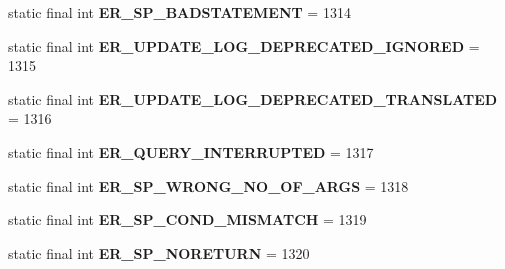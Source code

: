 \begin{DoxyCompactItemize}
static final int {\bfseries E\+R\+\_\+\+S\+P\+\_\+\+B\+A\+D\+S\+T\+A\+T\+E\+M\+E\+NT} = 1314
\item 
\mbox{\label{classcom_1_1mysql_1_1cj_1_1exceptions_1_1_mysql_error_numbers_ad3e4b41542fa2dc494d76996df92c1fd}} 
static final int {\bfseries E\+R\+\_\+\+U\+P\+D\+A\+T\+E\+\_\+\+L\+O\+G\+\_\+\+D\+E\+P\+R\+E\+C\+A\+T\+E\+D\+\_\+\+I\+G\+N\+O\+R\+ED} = 1315
\item 
\mbox{\label{classcom_1_1mysql_1_1cj_1_1exceptions_1_1_mysql_error_numbers_aa0b9f0221734bbec1a88cfa9b05177ef}} 
static final int {\bfseries E\+R\+\_\+\+U\+P\+D\+A\+T\+E\+\_\+\+L\+O\+G\+\_\+\+D\+E\+P\+R\+E\+C\+A\+T\+E\+D\+\_\+\+T\+R\+A\+N\+S\+L\+A\+T\+ED} = 1316
\item 
\mbox{\label{classcom_1_1mysql_1_1cj_1_1exceptions_1_1_mysql_error_numbers_ac9299f87c39b3b537c7926d5385e57de}} 
static final int {\bfseries E\+R\+\_\+\+Q\+U\+E\+R\+Y\+\_\+\+I\+N\+T\+E\+R\+R\+U\+P\+T\+ED} = 1317
\item 
\mbox{\label{classcom_1_1mysql_1_1cj_1_1exceptions_1_1_mysql_error_numbers_a2aa03ce51db0cec8e82b49ec0bf9875d}} 
static final int {\bfseries E\+R\+\_\+\+S\+P\+\_\+\+W\+R\+O\+N\+G\+\_\+\+N\+O\+\_\+\+O\+F\+\_\+\+A\+R\+GS} = 1318
\item 
\mbox{\label{classcom_1_1mysql_1_1cj_1_1exceptions_1_1_mysql_error_numbers_a9c9e49fde6fe5d6b047985000890eb6e}} 
static final int {\bfseries E\+R\+\_\+\+S\+P\+\_\+\+C\+O\+N\+D\+\_\+\+M\+I\+S\+M\+A\+T\+CH} = 1319
\item 
\mbox{\label{classcom_1_1mysql_1_1cj_1_1exceptions_1_1_mysql_error_numbers_a09136f421a4925b76a87fa090d8cee0f}} 
static final int {\bfseries E\+R\+\_\+\+S\+P\+\_\+\+N\+O\+R\+E\+T\+U\+RN} = 1320
\item 
\mbox{\label{classcom_1_1mysql_1_1cj_1_1exceptions_1_1_mysql_error_numbers_a650c8e062cc3d8b03ae4844a2ab39978}} 

\end{DoxyCompactItemize}
